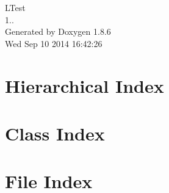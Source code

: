 \documentclass[twoside]{book}
\newcommand{\clearemptydoublepage}{%
  \newpage{\pagestyle{empty}\cleardoublepage}%
}
\begin{document}
\hypersetup{pageanchor=false}
\begin{titlepage}
\vspace*{7cm}
\begin{center}%
{\Large L\-Test \\[1ex]\large 1.. }\\
\vspace*{1cm}
{\large Generated by Doxygen 1.8.6}\\
\vspace*{0.5cm}
{\small Wed Sep 10 2014 16:42:26}\\
\end{center}
\end{titlepage}
\clearemptydoublepage
\tableofcontents
\clearemptydoublepage
{}
\hypersetup{pageanchor=true}

\chapter{Hierarchical Index}

\chapter{Class Index}

\chapter{File Index}

\end{document}
